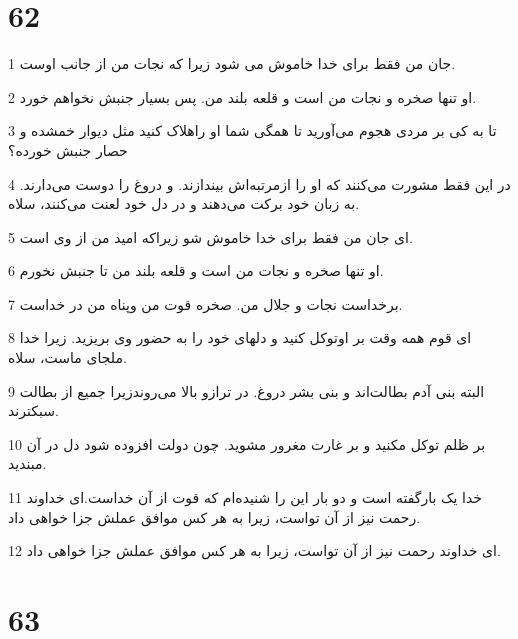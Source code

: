 \chapter{62}

\par 1 جان من فقط برای خدا خاموش می شود زیرا که نجات من از جانب اوست.
\par 2 او تنها صخره و نجات من است و قلعه بلند من. پس بسیار جنبش نخواهم خورد.
\par 3 تا به کی بر مردی هجوم می‌آورید تا همگی شما او راهلاک کنید مثل دیوار خمشده و حصار جنبش خورده؟
\par 4 در این فقط مشورت می‌کنند که او را ازمرتبه‌اش بیندازند. و دروغ را دوست می‌دارند. به زبان خود برکت می‌دهند و در دل خود لعنت می‌کنند، سلاه.
\par 5 ‌ای جان من فقط برای خدا خاموش شو زیراکه امید من از وی است.
\par 6 او تنها صخره و نجات من است و قلعه بلند من تا جنبش نخورم.
\par 7 برخداست نجات و جلال من. صخره قوت من وپناه من در خداست.
\par 8 ‌ای قوم همه وقت بر اوتوکل کنید و دلهای خود را به حضور وی بریزید. زیرا خدا ملجای ماست، سلاه.
\par 9 البته بنی آدم بطالت‌اند و بنی بشر دروغ. در ترازو بالا می‌روندزیرا جمیع از بطالت سبکترند.
\par 10 بر ظلم توکل مکنید و بر غارت مغرور مشوید. چون دولت افزوده شود دل در آن مبندید.
\par 11 خدا یک بارگفته است و دو بار این را شنیده‌ام که قوت از آن خداست.‌ای خداوند رحمت نیز از آن تواست، زیرا به هر کس موافق عملش جزا خواهی داد.
\par 12 ‌ای خداوند رحمت نیز از آن تواست، زیرا به هر کس موافق عملش جزا خواهی داد.
 
\chapter{63}

